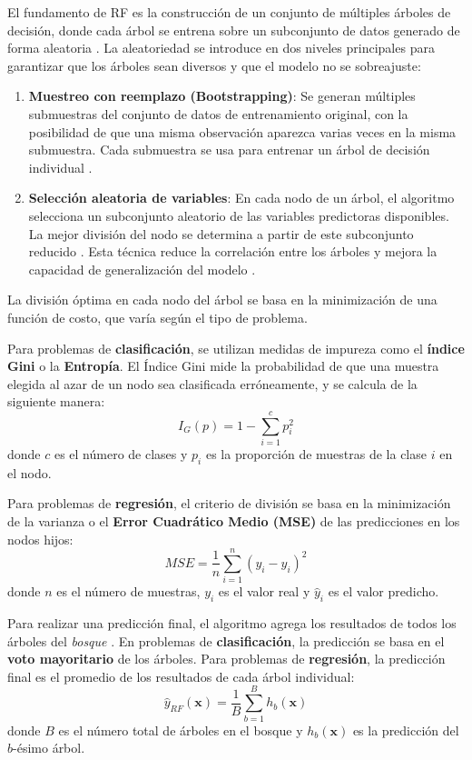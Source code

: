 El fundamento de RF es la construcci\'on de un conjunto de m\'ultiples \'arboles de decisi\'on, donde cada \'arbol se entrena sobre un subconjunto de datos generado de forma aleatoria \cite{salman2024}. La aleatoriedad se introduce en dos niveles principales para garantizar que los \'arboles sean diversos y que el modelo no se sobreajuste:

\begin{enumerate}
    \item \textbf{Muestreo con reemplazo (Bootstrapping)}: Se generan m\'ultiples submuestras del conjunto de datos de entrenamiento original, con la posibilidad de que una misma observaci\'on aparezca varias veces en la misma submuestra. Cada submuestra se usa para entrenar un \'arbol de decisi\'on individual \cite{salman2024}.
    \item \textbf{Selecci\'on aleatoria de variables}: En cada nodo de un \'arbol, el algoritmo selecciona un subconjunto aleatorio de las variables predictoras disponibles. La mejor divisi\'on del nodo se determina a partir de este subconjunto reducido \cite{cutler2011, salman2024}. Esta t\'ecnica reduce la correlaci\'on entre los \'arboles y mejora la capacidad de generalizaci\'on del modelo \cite{cutler2011}.
\end{enumerate}


La divisi\'on \'optima en cada nodo del \'arbol se basa en la minimizaci\'on de una funci\'on de costo, que var\'ia seg\'un el tipo de problema.

Para problemas de \textbf{clasificaci\'on}, se utilizan medidas de impureza como el \textbf{\'indice Gini} o la \textbf{Entrop\'ia}. El \'Indice Gini mide la probabilidad de que una muestra elegida al azar de un nodo sea clasificada err\'oneamente, y se calcula de la siguiente manera:
$$
I_G(p) = 1 - \sum_{i=1}^{c} p_i^2
$$
donde $c$ es el n\'umero de clases y $p_i$ es la proporci\'on de muestras de la clase $i$ en el nodo.

Para problemas de \textbf{regresi\'on}, el criterio de divisi\'on se basa en la minimizaci\'on de la varianza o el \textbf{Error Cuadr\'atico Medio (MSE)} de las predicciones en los nodos hijos:
$$
MSE = \frac{1}{n} \sum_{i=1}^{n} (y_i - \hat{y}_i)^2
$$
donde $n$ es el n\'umero de muestras, $y_i$ es el valor real y $\hat{y}_i$ es el valor predicho.

Para realizar una predicci\'on final, el algoritmo agrega los resultados de todos los \'arboles del \textit{bosque} \cite{salman2024}. En problemas de \textbf{clasificaci\'on}, la predicci\'on se basa en el \textbf{voto mayoritario} de los \'arboles. Para problemas de \textbf{regresi\'on}, la predicci\'on final es el promedio de los resultados de cada \'arbol individual:
$$
\hat{y}_{RF}(\mathbf{x}) = \frac{1}{B} \sum_{b=1}^{B} h_b(\mathbf{x})
$$
donde $B$ es el n\'umero total de \'arboles en el bosque y $h_b(\mathbf{x})$ es la predicci\'on del $b$-\'esimo \'arbol.


